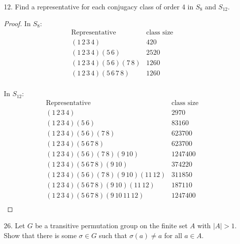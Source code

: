 \documentclass[10pt]{article}
\begin{document}
\begin{itemize}
\item[12.] Find a representative for each conjugacy class of order 4 in $S_8$ and $S_{12}$.
\begin{proof}
In $S_8$:
\begin{equation*}
\begin{matrix}
\text{Representative} & \text{class size} \\
(1\, 2\, 3\, 4) & 420 \\
(1\, 2\, 3\, 4)(5\, 6) & 2520 \\
(1\, 2\, 3\, 4)(5\, 6)(7\, 8) & 1260  \\
(1\, 2\, 3\, 4)(5\, 6\, 7\, 8) & 1260 \\
\end{matrix}
\end{equation*}

In $S_{12}$:
\begin{equation*}
\begin{matrix}
\text{Representative} & \text{class size} \\
(1\, 2\, 3\, 4) &  2970 \\
(1\, 2\, 3\, 4)(5\, 6) & 83160  \\
(1\, 2\, 3\, 4)(5\, 6)(7\, 8) & 623700 \\
(1\, 2\, 3\, 4)(5\, 6\, 7\, 8) & 623700 \\
(1\, 2\, 3\, 4)(5\, 6)(7\, 8)(9\, 10) & 1247400 \\
(1\, 2\, 3\, 4)(5\, 6\, 7\, 8)(9\, 10) & 374220 \\
(1\, 2\, 3\, 4)(5\, 6)(7\, 8)(9\, 10)(11\, 12) & 311850 \\
(1\, 2\, 3\, 4)(5\, 6\, 7\, 8)(9\, 10)(11\, 12) & 187110 \\
(1\, 2\, 3\, 4)(5\, 6\, 7\, 8)(9\, 10\, 11\, 12) & 1247400 \\

\end{matrix}
\end{equation*}
\end{proof}

\item[26.]  Let $G$ be a transitive permutation group on the
finite set $A$ with $|A|>1$. Show that there is some $\sigma\in G$
such that $\sigma(a)\ne a$ for all $a\in A$.


\end{itemize}
\end{document}
